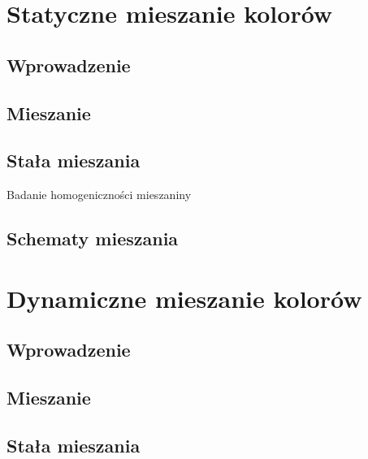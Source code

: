 \documentclass[a4paper,12pt]{book}
\begin{document}
\chapter{Statyczne mieszanie kolorów}
\section{Wprowadzenie}
\section{Mieszanie}
\section{Stała mieszania}
Badanie homogeniczności mieszaniny
\section{Schematy mieszania}
\chapter{Dynamiczne mieszanie kolorów}
\section{Wprowadzenie}
\section{Mieszanie}
\section{Stała mieszania}
\end{document}
